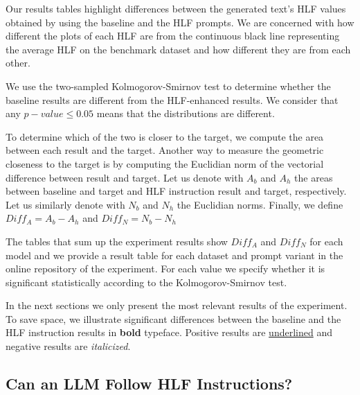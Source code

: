 \documentclass[runningheads,a4paper,11pt]{article}
\begin{document}
Our results tables highlight differences between the generated text's HLF values
obtained by using the baseline and the HLF prompts.
We are concerned with how different the plots of each HLF are from the
continuous black line representing the average HLF on the benchmark dataset and
how different they are from each other.

We use the two-sampled Kolmogorov-Smirnov test to determine whether the baseline
results are different from the HLF-enhanced results.
We consider that any $p-value \le 0.05$ means that the distributions are
different.

To determine which of the two is closer to the target, we compute the area
between each result and the target.
Another way to measure the geometric closeness to the target is by computing the
Euclidian norm of the vectorial difference between result and target.
Let us denote with $A_b$ and $A_h$ the areas between baseline and target and HLF
instruction result and target, respectively.
Let us similarly denote with $N_b$ and $N_h$ the Euclidian norms.
Finally, we define $Diff_A = A_b - A_h$ and $Diff_N = N_b - N_h$

The tables that sum up the experiment results show $Diff_A$ and $Diff_N$ for
each model and we provide a result table for each dataset and prompt variant in
the online repository of the experiment.
For each value we specify whether it is significant statistically according to
the Kolmogorov-Smirnov test.

In the next sections we only present the most relevant results of the
experiment.
To save space, we illustrate significant differences between the baseline and
the HLF instruction results in \textbf{bold} typeface.
Positive results are \underline{underlined} and negative results are
\textit{italicized}.

\subsection{Can an LLM Follow HLF Instructions?}
\end{document}
